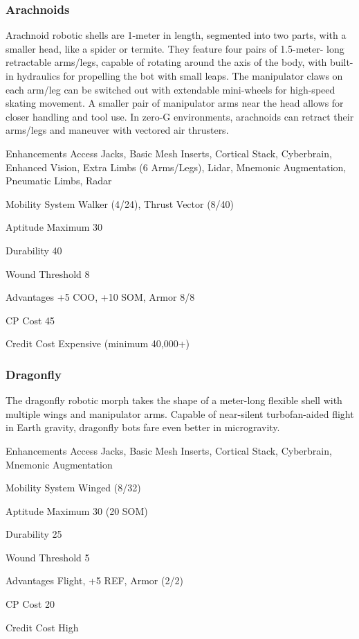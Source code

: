 \subsubsection{Arachnoids} \label{sec:starting-arachnoids} 

Arachnoid robotic shells are 1-meter in length, segmented into two parts, with a smaller head, like a spider or termite. They feature four pairs of 1.5-meter- long retractable arms/legs, capable of rotating around the axis of the body, with built-in hydraulics for propelling the bot with small leaps. The manipulator claws on each arm/leg can be switched out with extendable mini-wheels for high-speed skating movement. A smaller pair of manipulator arms near the head allows for closer handling and tool use. In zero-G environments, arachnoids can retract their arms/legs and maneuver with vectored air thrusters. 

\begin{description*} \item[Enhancements] Access Jacks, Basic Mesh Inserts, Cortical Stack, Cyberbrain, Enhanced Vision, Extra Limbs (6 Arms/Legs), Lidar, Mnemonic Augmentation, Pneumatic Limbs, Radar \item[Mobility System] Walker (4/24), Thrust Vector (8/40) \item[Aptitude Maximum] 30 \item[Durability] 40 \item[Wound Threshold] 8 \item[Advantages] +5 COO, +10 SOM, Armor 8/8 \item[CP Cost] 45 \item[Credit Cost] Expensive (minimum 40,000+) \end{description*} 

\subsubsection{Dragonfly} \label{sec:starting-dragonfly} 

The dragonfly robotic morph takes the shape of a meter-long flexible shell with multiple wings and manipulator arms. Capable of near-silent turbofan-aided flight in Earth gravity, dragonfly bots fare even better in microgravity. 

\begin{description*} \item[Enhancements] Access Jacks, Basic Mesh Inserts, Cortical Stack, Cyberbrain, Mnemonic Augmentation \item[Mobility System] Winged (8/32) \item[Aptitude Maximum] 30 (20 SOM) \item[Durability] 25 \item[Wound Threshold] 5 \item[Advantages] Flight, +5 REF, Armor (2/2) \item[CP Cost] 20 \item[Credit Cost] High \end{description*} 

